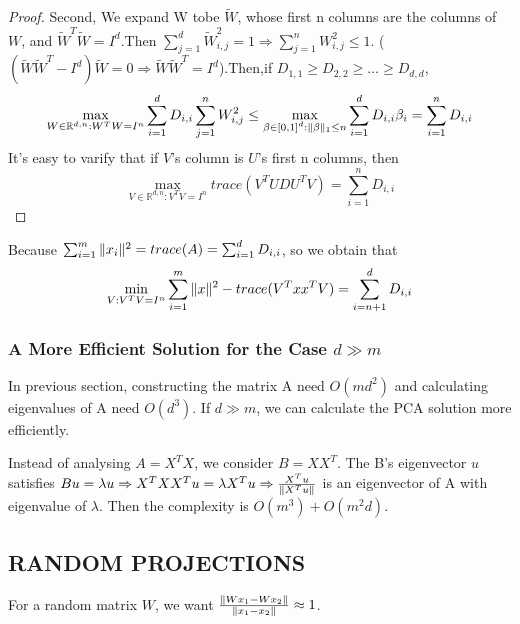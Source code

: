 \begin{lemma}
\begin{proof}
        Second, We expand W tobe $ \tilde{W} $, whose first n columns are the columns of $ W $, and $ \tilde{W}^T \tilde{W} = I^d $.Then $ \sum^{d}_{j=1} \tilde{W}^2_{i,j} = 1 \Rightarrow \sum^{n}_{j=1} W^2_{i,j} \le 1$. ($ (\tilde{W} \tilde{W}^T - I^d) \tilde{W} = 0 \Rightarrow  \tilde{W} \tilde{W}^T = I^d$).Then,if $ D_{1,1} \ge D_{2,2} \ge \ldots \ge D_{d,d} $,
        \[
            \max_{W \in \mathbb{R}^{d,n}: W^T W = I^n} \sum^{d}_{i=1} D_{i,i} \sum^{n}_{j=1} W^2_{i,j} \le \max_{\beta \in {[0, 1]}^d: \Arrowvert \beta \Arrowvert_1 \le n} \sum^{d}_{i=1} D_{i,i} \beta_{i} = \sum^{n}_{i=1} D_{i,i}
        \]
        It's easy to varify that if $ V $'s column is $ U $'s first n columns, then 
        \[
            \max_{V \in \mathbb{R}^{d,n}: V^T V = I^n} trace\left( V^T U D U^T V \right) = \sum^{n}_{i=1} D_{i,i}
        \]
    \end{proof}
\end{lemma}

Because $ \sum^{m}_{i=1} \Arrowvert x_i \Arrowvert^2 = trace(A) = \sum^{d}_{i=1} D_{i,i} $, so we obtain that
\[
    \min_{V: V^T V = I^n} \sum^{m}_{i=1} \Arrowvert x \Arrowvert^2 - trace(V^T x x^T V) = \sum^{d}_{i = n+1} D_{i,i}
\]

\subsubsection{A More Efficient Solution for the Case $ d \gg m $}%

In previous section, constructing the matrix A need $ O(md^2) $ and calculating eigenvalues of A need $ O(d^3) $.
If $ d \gg m $, we can calculate the PCA solution more efficiently.

Instead of analysing $ A = X^T X $, we consider $ B = XX^T $. The B's eigenvector $ u $ satisfies $ B u = \lambda u \Rightarrow X^T X X^T u = \lambda X^T u \Rightarrow \frac{X^T u}{ \Arrowvert X^T u \Arrowvert} $ is an eigenvector of A with eigenvalue of $ \lambda $. Then the complexity is $ O(m^3) + O(m^2 d) $.

\subsection{RANDOM PROJECTIONS}%

For a random matrix $ W $, we want $ \frac{ \Arrowvert W x_1 - W x_2 \Arrowvert}{ \Arrowvert x_1 - x_2  \Arrowvert} \approx 1 $.


